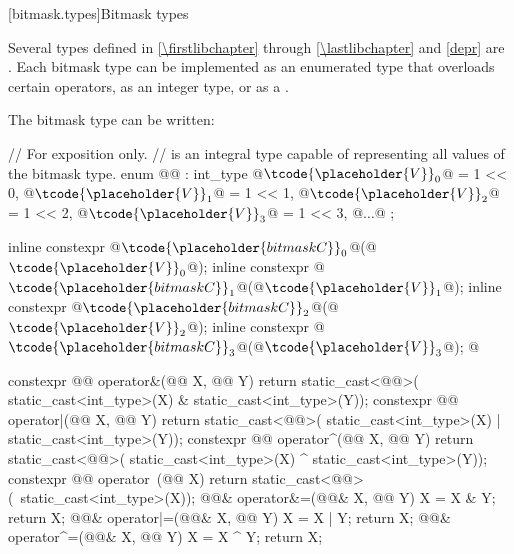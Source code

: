 [bitmask.types]{Bitmask types}

\pnum
Several types defined in \ref{\firstlibchapter} through \ref{\lastlibchapter}
and \ref{depr} are
.
Each bitmask type can be implemented as an
enumerated type that overloads certain operators, as an integer type,
or as a
.
%

\pnum
The bitmask type  can be written:

\begin{codeblock}
// For exposition only.
//  is an integral type capable of representing all values of the bitmask type.
enum @@ : int_type {
  @$\tcode{\placeholder{V}}_{0}$@ = 1 << 0, @$\tcode{\placeholder{V}}_{1}$@ = 1 << 1, @$\tcode{\placeholder{V}}_{2}$@ = 1 << 2, @$\tcode{\placeholder{V}}_{3}$@ = 1 << 3, @$\ldots$@
};

inline constexpr @$\tcode{\placeholder{bitmask C}}_{0}$@(@$\tcode{\placeholder{V}}_{0}{}$@);
inline constexpr @$\tcode{\placeholder{bitmask C}}_{1}$@(@$\tcode{\placeholder{V}}_{1}{}$@);
inline constexpr @$\tcode{\placeholder{bitmask C}}_{2}$@(@$\tcode{\placeholder{V}}_{2}{}$@);
inline constexpr @$\tcode{\placeholder{bitmask C}}_{3}$@(@$\tcode{\placeholder{V}}_{3}{}$@);
  @\vdots@

constexpr @@ operator&(@@ X, @@ Y) {
  return static_cast<@@>(
    static_cast<int_type>(X) & static_cast<int_type>(Y));
}
constexpr @@ operator|(@@ X, @@ Y) {
  return static_cast<@@>(
    static_cast<int_type>(X) | static_cast<int_type>(Y));
}
constexpr @@ operator^(@@ X, @@ Y){
  return static_cast<@@>(
    static_cast<int_type>(X) ^ static_cast<int_type>(Y));
}
constexpr @@ operator~(@@ X){
  return static_cast<@@>(~static_cast<int_type>(X));
}
@@& operator&=(@@& X, @@ Y){
  X = X & Y; return X;
}
@@& operator|=(@@& X, @@ Y) {
  X = X | Y; return X;
}
@@& operator^=(@@& X, @@ Y) {
  X = X ^ Y; return X;
}
\end{codeblock}

